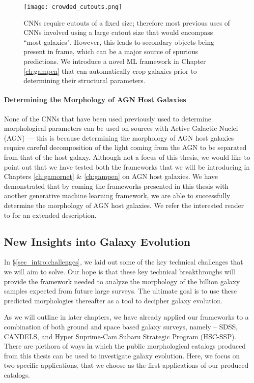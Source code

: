 \begin{figure}[htbp]
    \centering
    \texttt{[image: crowded\_cutouts.png]}
    \caption{CNNs require cutouts of a fixed size; therefore most previous uses of CNNs involved using a large cutout size that would encompass ``most galaxies". However, this leads to secondary objects being present in frame, which can be a major source of spurious predictions. We introduce a novel ML framework in Chapter \ref{ch:gampen} that can automatically crop galaxies prior to determining their structural parameters.}
    \label{fig_intro:crowded_cutouts}
\end{figure}


\paragraph{Determining the Morphology of AGN Host Galaxies} None of the CNNs that have been used previously used to determine morphological parameters can be used on sources with Active Galactic Nuclei (AGN) --- this is because determining the morphology of AGN host galaxies require careful decomposition of the light coming from the AGN to be separated from that of the host galaxy. Although not a focus of this thesis, we would like to point out that we have tested both the frameworks that we will be introducing in Chapters \ref{ch:gamornet} \& \ref{ch:gampen} on AGN host galaxies. We have demonstrated that by coming the frameworks presented in this thesis with another generative machine learning framework, we are able to successfully determine the morphology of AGN host galaxies. We refer the interested reader to \citet{tian_23} for an extended description.

\subsection{New Insights into Galaxy Evolution} \label{sec_intro:gal_evo_opportunities}

In \S \ref{sec_intro:challenges}, we laid out some of the key technical challenges that we will aim to solve. Our hope is that these key technical breakthroughs will provide the framework needed to analyze the morphology of the billion galaxy samples expected from future large surveys. The ultimate goal is to use these predicted morphologies thereafter as a tool to decipher galaxy evolution. 

As we will outline in later chapters, we have already applied our frameworks to a combination of both ground and space based galaxy surveys, namely -- SDSS, CANDELS, and Hyper Suprime-Cam Subaru Strategic Program (HSC-SSP). There are plethora of ways in which the public morphological catalogs produced from this thesis can be used to investigate galaxy evolution. Here, we focus on two specific applications, that we choose as the first applications of our produced catalogs. 

